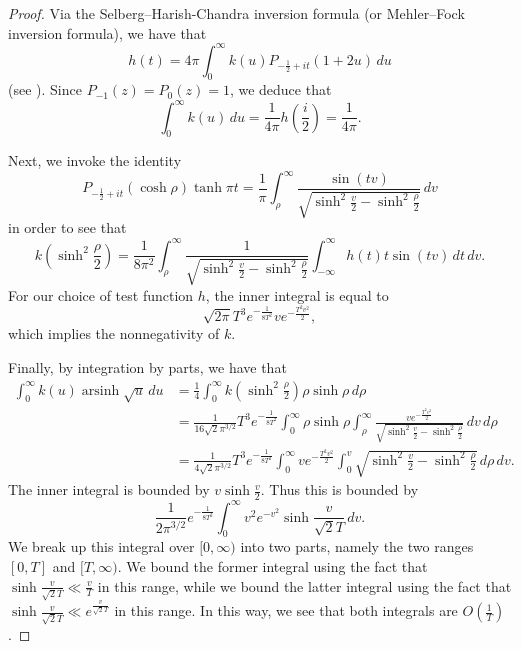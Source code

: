 \documentclass[11pt,a4paper]{amsart}
\DeclareMathOperator{\arsinh}{arsinh}
\numberwithin{equation}{section}
\theoremstyle{remark}
\theoremstyle{definition}
\begin{document}
\begin{proof}
Via the Selberg--Harish-Chandra inversion formula (or Mehler--Fock inversion formula), we have that
\[h(t) = 4\pi \int_{0}^{\infty} k(u) P_{-\frac{1}{2} + it}(1 + 2u) \, du\]
(see \cite[Chapter 1]{Iwa02}). Since $P_{-1}(z) = P_0(z) = 1$, we deduce that
\[\int_{0}^{\infty} k(u) \, du = \frac{1}{4\pi} h\left(\frac{i}{2}\right) = \frac{1}{4\pi}.\]

Next, we invoke the identity \cite[(8.715.2) and (8.737.4)]{GR15}
\[P_{-\frac{1}{2} + it}(\cosh \rho) \tanh \pi t = \frac{1}{\pi} \int_{\rho}^{\infty} \frac{\sin(tv)}{\sqrt{\sinh^2 \frac{v}{2} - \sinh^2 \frac{\rho}{2}}} \, dv\]
in order to see that
\[k\left(\sinh^2 \frac{\rho}{2}\right) = \frac{1}{8\pi^2} \int_{\rho}^{\infty} \frac{1}{\sqrt{\sinh^2 \frac{v}{2} - \sinh^2 \frac{\rho}{2}}} \int_{-\infty}^{\infty} h(t) t \sin(tv) \, dt \, dv.\]
For our choice of test function $h$, the inner integral is equal to
\[\sqrt{2\pi} T^3 e^{-\frac{1}{8T^2}} v e^{-\frac{T^2 v^2}{2}},\]
which implies the nonnegativity of $k$.

Finally, by integration by parts, we have that
\begin{align*}
\int_{0}^{\infty} k(u) \arsinh \sqrt{u} \, du & = \frac{1}{4} \int_{0}^{\infty} k\left(\sinh^2 \frac{\rho}{2}\right) \rho \sinh \rho \, d\rho	\\
& = \frac{1}{16\sqrt{2} \pi^{3/2}} T^3 e^{-\frac{1}{8T^2}} \int_{0}^{\infty} \rho \sinh \rho \int_{\rho}^{\infty} \frac{v e^{-\frac{T^2 v^2}{2}}}{\sqrt{\sinh^2 \frac{v}{2} - \sinh^2 \frac{\rho}{2}}} \, dv \, d\rho	\\
& = \frac{1}{4\sqrt{2} \pi^{3/2}} T^3 e^{-\frac{1}{8T^2}} \int_{0}^{\infty} v e^{-\frac{T^2 v^2}{2}} \int_{0}^{v} \sqrt{\sinh^2 \frac{v}{2} - \sinh^2 \frac{\rho}{2}} \, d\rho \, dv.
\end{align*}
The inner integral is bounded by $v \sinh \frac{v}{2}$. Thus this is bounded by
\[\frac{1}{2\pi^{3/2}} e^{-\frac{1}{8T^2}} \int_{0}^{\infty} v^2 e^{-v^2} \sinh \frac{v}{\sqrt{2} T} \, dv.\]
We break up this integral over $[0,\infty)$ into two parts, namely the two ranges $[0,T]$ and $[T,\infty)$. We bound the former integral using the fact that $\sinh \frac{v}{\sqrt{2} T} \ll \frac{v}{T}$ in this range, while we bound the latter integral using the fact that $\sinh \frac{v}{\sqrt{2} T} \ll e^{\frac{v}{\sqrt{2}T}}$ in this range. In this way, we see that both integrals are $O(\frac{1}{T})$.
\end{proof}
\end{document}

